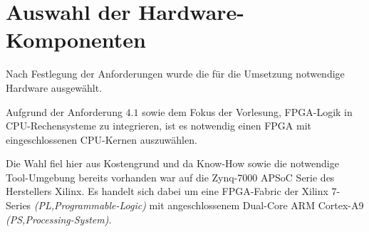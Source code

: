 \section{Auswahl der Hardware-Komponenten}
Nach Festlegung der Anforderungen wurde die für die Umsetzung notwendige Hardware ausgewählt.

Aufgrund der Anforderung $4.1$ sowie dem Fokus der Vorlesung, FPGA-Logik in \acs{CPU}-Rechensysteme zu integrieren, 
ist es notwendig einen \acs{FPGA} mit eingeschlossenen \acs{CPU}-Kernen auszuwählen.

Die Wahl fiel hier aus Kostengrund und da Know-How sowie die notwendige Tool-Umgebung bereits vorhanden war auf die Zynq-7000 \acs{APSoC} Serie des Herstellers Xilinx.
Es handelt sich dabei um eine \acs{FPGA}-Fabric der Xilinx 7-Series \textit{(PL,Programmable-Logic)} mit angeschlossenem Dual-Core ARM Cortex-A9 \textit{(PS,Processing-System)}.


